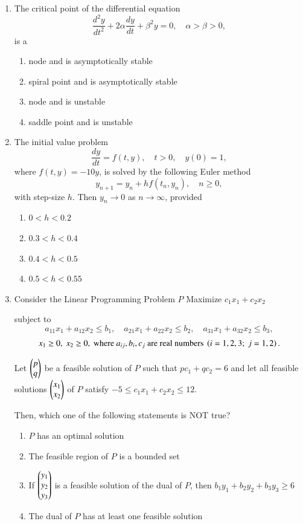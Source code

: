 \documentclass[journal,12pt,onecolumn]{IEEEtran}
\theoremstyle{remark}
\begin{document}
\begin{enumerate}[start=1, label=Q.\arabic*]
\hfill{}
\item The critical point of the differential equation
\[
\dfrac{d^{2}y}{dt^{2}}+2\alpha\dfrac{dy}{dt}+\beta^{2}y=0,\quad \alpha>\beta>0,
\]
is a
\begin{enumerate}
\item node and is asymptotically stable
\item spiral point and is asymptotically stable
\item node and is unstable
\item saddle point and is unstable
\end{enumerate}

\hfill{}


\item The initial value problem
\[
\dfrac{dy}{dt}=f(t,y),\quad t>0,\quad y(0)=1,
\]
where $f(t,y)=-10y$, is solved by the following Euler method
\[
y_{n+1}=y_{n}+h f(t_{n},y_{n}),\quad n \ge 0,
\]
with step\mbox{-}size $h$. Then $y_{n}\to 0$ as $n \to \infty$, provided
\begin{enumerate}
\item $0<h<0.2$
\item $0.3<h<0.4$
\item $0.4<h<0.5$
\item $0.5<h<0.55$
\end{enumerate}

\hfill{}
\item Consider the Linear Programming Problem $P$\brak{:}  
Maximize $c_{1}x_{1}+c_{2}x_{2}$  

subject to
\[
a_{11}x_{1}+a_{12}x_{2}\leq b_{1},\quad
a_{21}x_{1}+a_{22}x_{2}\leq b_{2},\quad
a_{31}x_{1}+a_{32}x_{2}\leq b_{3},
\]
\[
x_{1}\geq 0,\ x_{2}\geq 0,\ \text{where } a_{ij}, b_{i}, c_{j} \text{ are real numbers } \brak{i=1,2,3;\ j=1,2}.
\]

Let $\begin{pmatrix}p\\q\end{pmatrix}$ be a feasible solution of $P$ such that $pc_{1}+qc_{2}=6$ and let all feasible solutions $\begin{pmatrix}x_{1}\\x_{2}\end{pmatrix}$ of $P$ satisfy $-5\leq c_{1}x_{1}+c_{2}x_{2}\leq 12$.  

Then, which one of the following statements is NOT true?  
\begin{enumerate}
\item $P$ has an optimal solution
\item The feasible region of $P$ is a bounded set
\item If $\begin{pmatrix}y_{1}\\y_{2}\\y_{3}\end{pmatrix}$ is a feasible solution of the dual of $P$, then $b_{1}y_{1}+b_{2}y_{2}+b_{3}y_{3}\geq 6$
\item The dual of $P$ has at least one feasible solution
\end{enumerate}


\end{enumerate}
\end{document}
